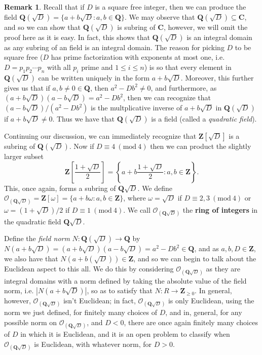 \documentclass[9pt,reqno]{amsart}
\theoremstyle{definition}
\newtheorem{rem}{Remark}[section]
\newcommand{\cc}{\mathbf C}
\newcommand{\zz}{\mathbf Z}
\newcommand{\qq}{\mathbf Q}
\newcommand{\Mod}[1]{\ (\mathrm{mod}\ #1)}
\begin{document}
\begin{rem}
Recall that if $D$ is a square free integer, then we can produce the field $\mathbf{Q} (\sqrt{D} ) = \{a +b \sqrt{D} \colon a, b \in \qq \}$. We may observe that $\qq (\sqrt{D} ) \subseteq \cc$, and so we can show that $\qq (\sqrt{D})$ is subring of $\cc$, however, we will omit the proof here as it is easy. In fact, this shows that $\qq (\sqrt{D})$ is an integral domain as any subring of an field is an integral domain. The reason for picking $D$ to be square free ($D$ has prime factorization with exponents at most one, i.e. $D = p_1 p_2 \cdots p_n$ with all $p_i$ prime and $1 \leq i \leq n$) is so that every element in $\qq (\sqrt{D})$ can be written uniquely in the form $a+b \sqrt{D}$. Moreover, this further gives us that if $a, b \neq 0 \in \qq$, then $a^2 - Db^2 \neq 0$, and furthermore, as $(a+b\sqrt{D})(a-b\sqrt{D}) = a^2 - Db^2$, then we can recognize that $(a-b\sqrt{D})/(a^2 - Db^2)$ is the multplicative inverse of $a+b\sqrt{D}$ in $\qq (\sqrt{D})$ if $a+b\sqrt{D} \neq 0$. Thus we have that $\qq (\sqrt{D})$ is a field (called a \textit{quadratic field}).

Continuing our discussion, we can immediately recognize that $\zz [\sqrt{D}] $ is a subring of $\qq (\sqrt{D})$. Now if $D \equiv 4 \Mod{4}$ then we can product the slightly larger subset $$\zz \left [ \frac{1+\sqrt{D}}{2} \right] =  \left \{ a+b \frac{1+ \sqrt{D}}{2} \colon a, b \in \zz \right \}. $$ This, once again, forms a subring of $\qq \sqrt{D}$. We define $\mathcal{O}_{(\qq \sqrt{D})} = \zz [\omega ] = \{a + b \omega \colon a, b \in \zz \}$, where $\omega = \sqrt{D}$ if $D \equiv 2, 3 \Mod{4}$ or $\omega = (1+\sqrt{D})/ 2$ if $D \equiv 1 \Mod{4}$. We call $\mathcal {O}_{ (\qq \sqrt{D} )}$ the \textbf{ring of integers} in the quadratic field $\qq\sqrt{D}$. 

Define the \textit{field norm} $N \colon \qq (\sqrt{D})  \to \qq$ by $N (a+b \sqrt{D}) = (a+b\sqrt{D})(a-b\sqrt{D}) = a^2 - Db^2 \in \qq$, and as $a, b, D \in \zz$, we also have that $N(a+b (\sqrt{D})) \in \zz$, and so we can begin to talk about the Euclidean aspect to this all. We do this by considering $\mathcal{O}_{(\qq \sqrt{D})}$ as they are integral domains with a norm defined by taking the absolute value of the field norm, i.e. $|N(a+b\sqrt{D})|$, so as to satisfy that $N  \colon R \to \zz_{\geq 0 }$. In general, however, $\mathcal{O}_{(\qq \sqrt{D})}$ isn't Euclidean; in fact, $\mathcal{O}_{(\qq \sqrt{D})}$ is only Euclidean, using the norm we just defined, for finitely many choices of $D$, and in, general, for any possible norm on $\mathcal{O}_{(\qq \sqrt{D})}$, and $D<0$, there are once again finitely many choices of $D$ in which it is Euclidean, and it is an open problem to classify when $\mathcal{O}_{(\qq \sqrt{D})}$ is Euclidean, with whatever norm, for $D>0$. 
\end{rem}
\end{document}
